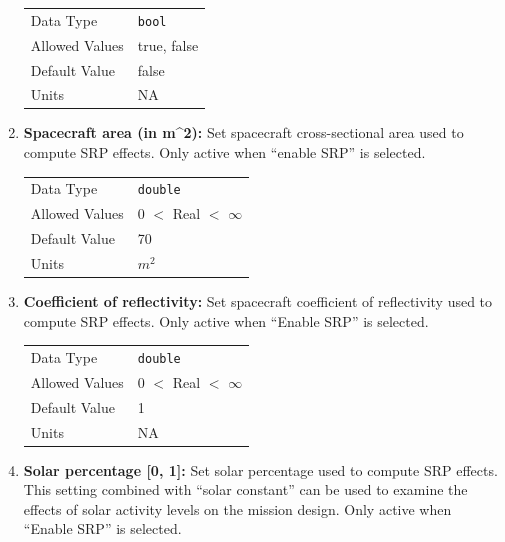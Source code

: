 \begin{enumerate}
            \begin{table}[H]
                \hspace{2cm}
                \begin{tabular}{ll}
                Data Type & \verb|bool| \\
                Allowed Values & true, false \\
                Default Value & false \\
                Units & NA
                \end{tabular}
            \end{table}

        \item \textbf{Spacecraft area (in m\^{}2):} Set spacecraft cross-sectional area used to compute \ac{SRP} effects. Only active when ``enable \ac{SRP}'' is selected.

            \begin{table}[H]
                \hspace{2cm}
                \begin{tabular}{ll}
                Data Type & \verb|double| \\
                Allowed Values & 0 $<$ Real $<$ $\infty$ \\
                Default Value & 70 \\
                Units & $m^2$
                \end{tabular}
            \end{table}

        \item \textbf{Coefficient of reflectivity:} Set spacecraft coefficient of reflectivity used to compute \ac{SRP} effects. Only active when ``Enable \ac{SRP}'' is selected.

            \begin{table}[H]
                \hspace{2cm}
                \begin{tabular}{ll}
                Data Type & \verb|double| \\
                Allowed Values & 0 $<$ Real $<$ $\infty$ \\
                Default Value & 1 \\
                Units & NA
                \end{tabular}
            \end{table}

        \item \textbf{Solar percentage [0, 1]:} Set solar percentage used to compute \ac{SRP} effects. This setting combined with ``solar constant'' can be used to examine the effects of solar activity levels on the mission design. Only active when ``Enable \ac{SRP}'' is selected.
        

\end{enumerate}
